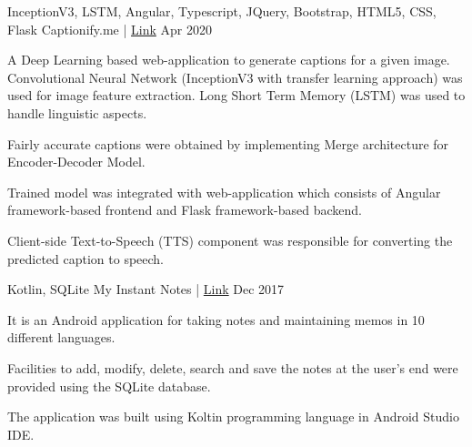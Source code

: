 

\begin{cventries}
\cventry
    {\textnormal{InceptionV3, LSTM, Angular, Typescript, JQuery, Bootstrap, HTML5, CSS, Flask}} %
    {Captionify.me | \href{https://github.com/Rpmalukani22/Automatic-Image-Caption-Generator}{ Link}} %
    { } %
    {Apr 2020} %
    {
      \begin{cvitems} %
        \item {A Deep Learning based web-application to generate captions for a given image. Convolutional Neural Network (InceptionV3 with transfer learning approach) was used for image feature extraction. Long Short Term Memory (LSTM) was used to handle linguistic aspects.}
        \item{Fairly accurate captions were obtained by implementing Merge architecture for Encoder-Decoder Model.}
        \item {Trained model was integrated with web-application which consists of Angular framework-based frontend and Flask framework-based backend.}
        \item{ Client-side Text-to-Speech (TTS) component was responsible for converting the predicted caption to speech.}
        \end{cvitems}
    }
  \cventry
    {\textnormal{Kotlin, SQLite}} %
    {My Instant Notes | \href{https://play.google.com/store/apps/details?id=dropdwn.ruchitesh.com.notes}{ Link}} %
    { } %
    {Dec 2017} %
    {
      \begin{cvitems} %
        \item {It is an Android application for taking notes and maintaining memos in 10 different languages.}
        \item{Facilities to add, modify, delete, search and save the notes at the user's end were provided using the SQLite database.}
        \item{The application was built using Koltin programming language in Android Studio IDE.}

\end{cvitems}}
\end{cventries}
